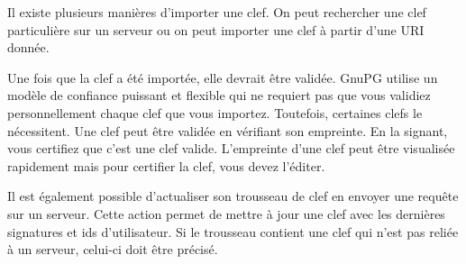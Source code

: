 Il existe plusieurs manières d'importer une clef. On peut rechercher une clef particulière sur un serveur ou on peut importer une clef à partir d'une URI donnée.

Une fois que la clef a été importée, elle devrait être validée. GnuPG utilise un modèle de confiance puissant et flexible qui ne requiert pas que vous validiez personnellement chaque clef que vous importez. Toutefois, certaines clefs le nécessitent. Une clef peut être validée en vérifiant son empreinte. En la signant, vous certifiez que c'est une clef valide. L'empreinte d'une clef peut être visualisée rapidement mais pour certifier la clef, vous devez l'éditer.

Il est également possible d'actualiser son trousseau de clef en envoyer une requête sur un serveur. Cette action permet de mettre à jour une clef avec les dernières signatures et ids d'utilisateur. Si le trousseau contient une clef qui n'est pas reliée à un serveur, celui-ci doit être précisé.


